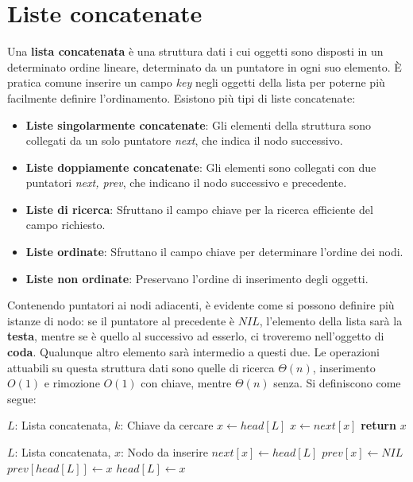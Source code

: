\section{Liste concatenate}
Una \textbf{lista concatenata} è una struttura dati i cui oggetti sono disposti in un determinato ordine lineare, determinato da un puntatore in ogni
suo elemento. È pratica comune inserire un campo \textit{key} negli oggetti della lista per poterne più facilmente definire l'ordinamento. Esistono più
tipi di liste concatenate: \begin{itemize}
	\item \textbf{Liste singolarmente concatenate}: Gli elementi della struttura sono collegati da un solo puntatore \textit{next}, che indica il nodo
	successivo.
	\item \textbf{Liste doppiamente concatenate}: Gli elementi sono collegati con due puntatori \textit{next, prev}, che indicano il nodo successivo e
	precedente.
	\item \textbf{Liste di ricerca}: Sfruttano il campo chiave per la ricerca efficiente del campo richiesto.
	\item \textbf{Liste ordinate}: Sfruttano il campo chiave per determinare l'ordine dei nodi.
	\item \textbf{Liste non ordinate}: Preservano l'ordine di inserimento degli oggetti.
\end{itemize}

\noindent Contenendo puntatori ai nodi adiacenti, è evidente come si possono definire più istanze di nodo: se il puntatore al precedente è $NIL$,
l'elemento della lista sarà la \textbf{testa}, mentre se è quello al successivo ad esserlo, ci troveremo nell'oggetto di \textbf{coda}. Qualunque altro
elemento sarà intermedio a questi due. Le operazioni attuabili su questa struttura dati sono quelle di ricerca $\Theta(n)$, inserimento $O(1)$ e
rimozione $O(1)$ con chiave, mentre $\Theta(n)$ senza. Si definiscono come segue: \begin{algorithm}[h]
	\caption{list-search(L, k)}
	\begin{algorithmic}
		\Require $L$: Lista concatenata, $k$: Chiave da cercare
		\State $x\gets head[L]$
			\State $x\gets next[x]$
		\EndWhile
		\State \textbf{return} $x$
	\end{algorithmic}
\end{algorithm}

\begin{algorithm}[h]
	\caption{list-prepend(L, x)}
	\begin{algorithmic}
		\Require $L$: Lista concatenata, $x$: Nodo da inserire
		\State $next[x]\gets head[L]$
		\State $prev[x]\gets NIL$
		\If{$head[L]\neq NIL$}
			\State $prev[head[L]]\gets x$
		\EndIf
		\State $head[L]\gets x$
	\end{algorithmic}
\end{algorithm}

